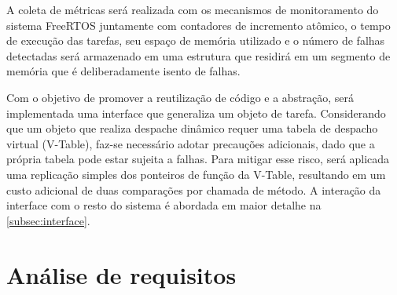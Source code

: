 A coleta de métricas será realizada com os mecanismos de monitoramento do sistema FreeRTOS juntamente com contadores de incremento atômico, o tempo de execução das tarefas, seu espaço de memória utilizado e o número de falhas detectadas será armazenado em uma estrutura que residirá em um segmento de memória que é deliberadamente isento de falhas.

Com o objetivo de promover a reutilização de código e a abstração, será implementada uma interface que generaliza um objeto de tarefa. Considerando que um objeto que realiza despache dinâmico requer uma tabela de despacho virtual (V-Table), faz-se necessário adotar precauções adicionais, dado que a própria tabela pode estar sujeita a falhas. Para mitigar esse risco, será aplicada uma replicação simples dos ponteiros de função da V-Table, resultando em um custo adicional de duas comparações por chamada de método. A interação da interface com o resto do sistema é abordada em maior detalhe na \autoref{subsec:interface}.

\section{Análise de requisitos}
\label{sec:req}

